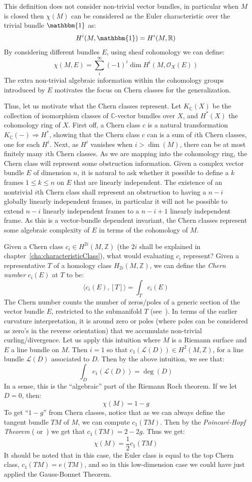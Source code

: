 \documentclass{book}
\newcommand{\R}{{\mathbb{R}}}
\newcommand{\Z}{{\mathbb{Z}}}
\newcommand{\C}{{\mathbb{C}}}
\newcommand{\CL}{{\mathcal{L}}}
\newcommand{\CO}{{\mathcal{O}}}
\renewcommand{\deg}{{\operatorname{deg}}}
\newcommand{\Rw}{\Rightarrow}
\begin{document}
This definition does not consider non-trivial vector bundles, in particular when $M$ is closed then $\chi(M)$
can be considered as the Euler characteristic over the trivial bundle $\mathbbm{1}$ as:
\[
  H^i(M, \mathbbm{1}) = H^i(M, \R)
\]
By considering different bundles $E$, using sheaf cohomology we can define:
\[
  \chi(M, E) = \sum_i^\infty (-1)^i \dim H^i(M, \CO_X(E))
\]
The extra non-trivial algebraic information within the cohomology groups introduced by $E$ motivates the focus on Chern
classes for the generalization.


Thus, let us motivate what the Chern classes represent. Let $K_\C(X)$ be the collection of isomorphism classes
of $\C$-vector bundles over $X$, and $H^*(X)$ the cohomology ring of $X$. First off, a Chern class $c$ is a
natural transformation $K_\C(-) \Rw H^*$, showing that the Chern class $c$ can is a sum of $i$th Chern classes,
one for each $H^i$. Next, as $H^i$ vanishes when $i > \dim(M)$, there can be at most finitely many $i$th Chern
classes. As we are mapping into the cohomology ring, the Chern class will represent some obstruction
information. Given a complex vector bundle $E$ of dimension $n$, it is natural to ask whether it possible to
define a $k$ frames $1\le k \le n$ on $E$ that are linearly independent. The existence of an nontrivial $i$th
Chern class shall represent an obstruction to having a $n-i$ globally linearly independent
frames, in particular it will not be possible to extend $n-i$ linearly independent frames to a $n-i+1$
linearly independent frame. As this is a vector-bundle dependent invariant, the Chern classes represent some
algebraic complexity of $E$ in terms of the cohomology of $M$.

Given a Chern class $c_i \in H^{2i}(M, \Z)$ (the $2i$ shall be explained in
chapter~\ref{cha:characteristicClass}), what would evaluating $c_i$ represent? Given a representative $T$ of
a homology class $H_{2i}(M, \Z)$, we can define the \emph{Chern number} $c_i(E)$ at $T$ to be:
\[
  \langle c_i(E), [T] \rangle = \int_T c_i(E)
\]
The Chern number counts the number of zeros/poles of a generic section of the vector bundle $E$, restricted to the
submanifold $T$ (see~\cite{NateKTheory}). In terms of the earlier curvature interpretation, it is around
zero or poles (where poles can be considered as zero's in the reverse orientation) that we accumulate non-trivial
curling/divergence. Let us apply this intuition where $M$ is a Riemann surface and $E$ a line bundle on $M$.
Then $i = 1$ so that $c_1(\CL(D)) \in H^2(M, \Z)$, for a line bundle $\CL(D)$ associated to $D$. Then by the
above intuition, we see that:
\[
  \int_D c_1(\CL(D)) = \deg(D)
\]
In a sense, this is the ``algebraic'' part of the Riemann Roch theorem. If we let $D = 0$, then:
\[
  \chi(M) = 1-g
\]
To get ``$1-g$'' from Chern classes, notice that as we can always define the tangent bundle $TM$ of
$M$, we can compute $c_1(TM)$. Then by the \emph{Poincar\'e-Hopf Theorem} (\cite{NateAlgTop}
or~\cite{NateDiffGeo}) we get that $c_1(TM) = 2-2g$. Thus we get:
\[
  \chi(M) = \frac{1}{2}c_1(TM)
\]
It should be noted that in this case, the Euler class is equal to the top Chern class, $c_1(TM) = e(TM)$, and
so in this low-dimension case we could have just applied the Gauss-Bonnet Theorem.
\end{document}
